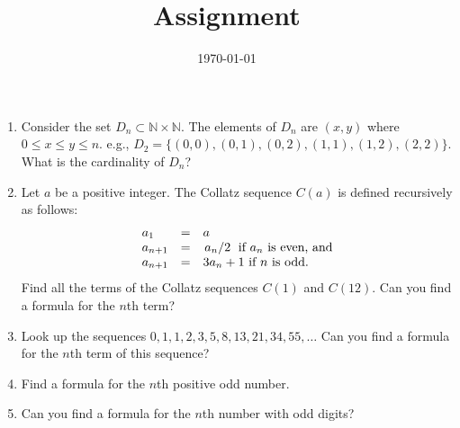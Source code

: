 \documentclass[12pt]{amsart}
\title{Assignment}
\date{\today}
\begin{document}
\maketitle
\begin{enumerate}
\item Consider the set $D_n \subset \mathbb{N} \times \mathbb{N}$. The elements of $D_n$ are $(x,y)$ where $0 \leq x \leq y \leq n$. e.g., $D_2 =  \{ (0,0), (0,1), (0,2), (1,1), (1,2), (2,2)\}$. What is the cardinality of $D_n$?
\item Let $a$ be a positive integer. The Collatz sequence $C(a)$ is defined recursively as follows:
\begin{equation*}
  \begin{array}{lcl}
    a_1 &=& a \\
    a_{n+1}&=&\flatfrac{a_n}{2} \text { if } a_n \text{ is even, and}\\
    a_{n+1}&=&3a_n+1 \text{ if } n \text{ is odd.}
  \end{array}
\end{equation*}
Find all the terms of the Collatz sequences $C(1)$ and $C(12)$. Can you find a formula for the $n$th term?

\item Look up the sequences $0, 1, 1, 2, 3, 5, 8, 13, 21, 34, 55,\ldots$ Can you find a formula for the $n$th term of this sequence?
\item Find a formula for the $n$th positive odd number.
\item Can you find a formula for the $n$th number with odd digits?
\end{enumerate}
\end{document}
